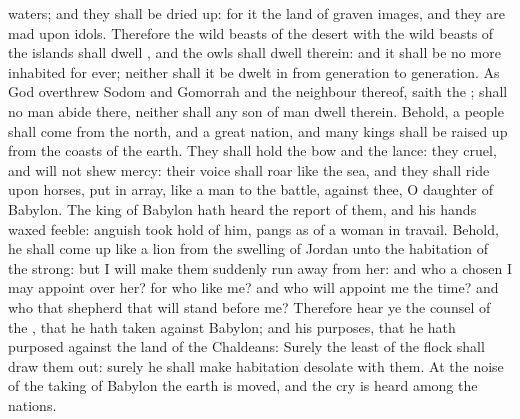 {waters; and they shall be dried
up: for it
{} the
land of graven
images, and they are
mad upon
{}
idols.
Therefore the wild beasts of the
desert with the wild beasts of the
islands shall
dwell
{}, and the
owls shall
dwell therein: and it shall be no more
inhabited for
ever; neither shall it be
dwelt in from
generation to
generation.
As
God
overthrew
Sodom and
Gomorrah and the
neighbour
{} thereof,
saith the
{};
{} shall no
man
abide there, neither shall any
son of
man
dwell therein.
Behold, a
people shall
come from the
north, and a
great
nation, and
many
kings shall be raised
up from the
coasts of the
earth.
They shall
hold the
bow and the
lance: they
{}
cruel, and will not shew
mercy: their
voice shall
roar like the
sea, and they shall
ride upon
horses,
{} put in
array, like a
man to the
battle, against thee, O
daughter of
Babylon.
The
king of
Babylon hath
heard the
report of them, and his
hands waxed
feeble:
anguish took
hold of him,
{}
pangs as of a woman in
travail.
Behold, he shall come
up like a
lion from the
swelling of
Jordan unto the
habitation of the
strong: but I will
make them
suddenly run
away from her: and who
{} a
chosen
{} I may
appoint over her? for who
{} like me? and who will appoint me the
time? and who
{} that
shepherd that will
stand
before me?
Therefore
hear ye the
counsel of the
{}, that he hath
taken against
Babylon; and his
purposes, that he hath
purposed against the
land of the
Chaldeans: Surely the
least of the
flock shall draw them
out: surely he shall make
{}
habitation
desolate with them.
At the
noise of the
taking of
Babylon the
earth is
moved, and the
cry is
heard among the
nations.

}
